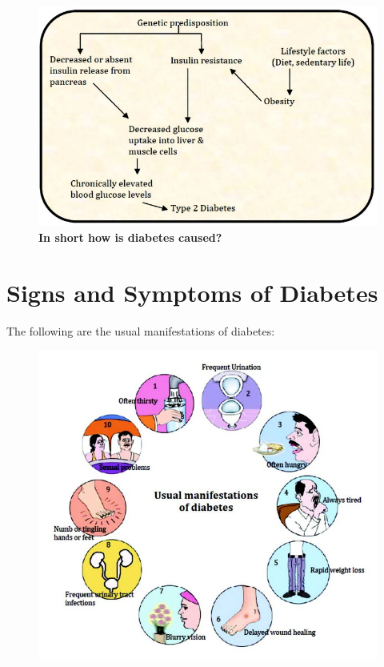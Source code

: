 \begin{figure}
\caption{\textbf{In short how is diabetes caused?}}
\includegraphics{images/022.jpg}
\end{figure}

\chapter{Signs and Symptoms of Diabetes}

The following are the usual manifestations of diabetes:

\begin{figure}
\includegraphics{images/023.jpg}
\end{figure}

